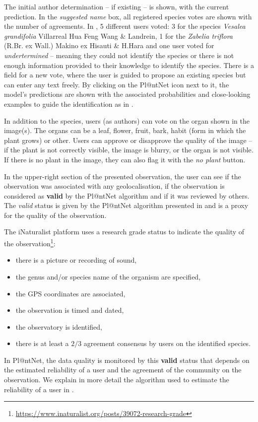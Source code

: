 The initial author determination -- if existing -- is shown, with the current prediction.
In the \emph{suggested name} box, all registered species votes are shown with the number of agreements.
In , 5 different users voted: 3 for the species \emph{Vesalea grandifolia} Villarreal Hua Feng Wang \& Landrein, 1 for the \emph{Zabelia triflora} (R.Br. ex Wall.) Makino ex Hisauti \& H.Hara and one user voted for \emph{undertermined} -- meaning they could not identify the species or there is not enough information provided to their knowledge to identify the species.
There is a field for a new vote, where the user is guided to propose an existing species but can enter any text freely.
By clicking on the Pl@ntNet icon next to it, the model's predictions are shown with the associated probabilities and close-looking examples to guide the identification as in .

In addition to the species, users (as authors) can vote on the organ shown in the image(s).
The organs can be a leaf, flower, fruit, bark, habit (form in which the plant grows) or other.
Users can approve or disapprove the quality of the image -- if the plant is not correctly visible, the image is blurry, or the organ is not visible.
If there is no plant in the image, they can also flag it with the \emph{no plant} button.

In the upper-right section of the presented observation, the user can see if the observation was associated with any geolocalisation, if the observation is considered as \textbf{valid} by the Pl@ntNet algorithm and if it was reviewed by others.
The \emph{valid} status is given by the Pl@ntNet algorithm presented in  and is a proxy for the quality of the observation.

The iNaturalist platform uses a research grade status to indicate the quality of the observation\footnote{\url{https://www.inaturalist.org/posts/39072-research-grade}}:
\begin{itemize}
        \item there is a picture or recording of sound,
        \item the genus and/or species name of the organism are specified,
        \item the GPS coordinates are associated,
        \item the observation is timed and dated,
        \item the observatory is identified,
        \item there is at least a $2/3$ agreement consensus by users on the identified species.
\end{itemize}
In Pl@ntNet, the data quality is monitored by this \textbf{valid} status that depends on the estimated reliability of a user and the agreement of the community on the observation.
We explain in more detail the algorithm used to estimate the reliability of a user in .

